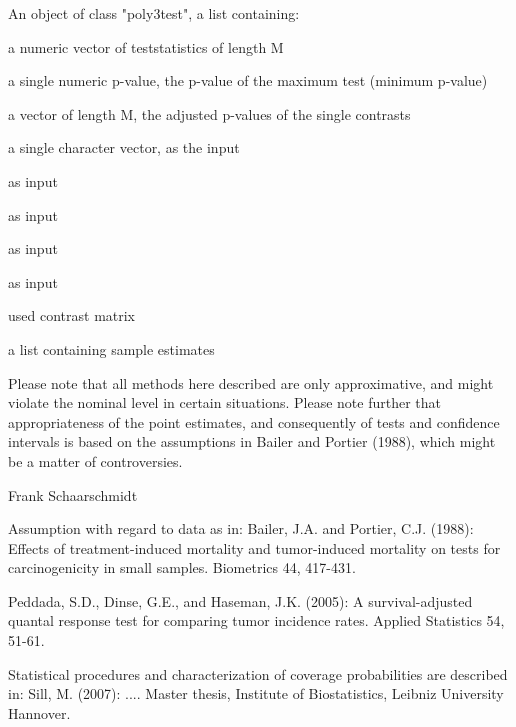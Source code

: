 \begin{Value}
An object of class "poly3test", a list containing:

\begin{ldescription}
\item[\code{teststat}] a numeric vector of teststatistics of length M
\item[\code{pval}] a single numeric p-value, the p-value of the maximum test (minimum p-value)
\item[\code{p.val.adj}] a vector of length M, the adjusted p-values of the single contrasts
\item[\code{alternative}] a single character vector, as the input
\item[\code{time}] as input
\item[\code{status}] as input
\item[\code{f}] as input
\item[\code{method}] as input
\item[\code{cmat}] used contrast matrix
\item[\code{sample.est}] a list containing sample estimates
\end{ldescription}
\end{Value}
\begin{Note}\relax
Please note that all methods here described are only approximative, and might violate the nominal level in certain situations.
Please note further that appropriateness of the point estimates, and consequently of tests and confidence intervals is based on the assumptions in Bailer and Portier (1988),
which might be a matter of controversies.
\end{Note}
\begin{Author}\relax
Frank Schaarschmidt
\end{Author}
\begin{References}\relax
Assumption with regard to data as in:
Bailer, J.A. and Portier, C.J. (1988):
Effects of treatment-induced mortality and tumor-induced mortality on tests for carcinogenicity in small samples.
Biometrics 44, 417-431.

Peddada, S.D., Dinse, G.E., and Haseman, J.K. (2005):
A survival-adjusted quantal response test for comparing tumor incidence rates.
Applied Statistics 54, 51-61.

Statistical procedures and characterization of coverage probabilities are described in:
Sill, M. (2007):
....
Master thesis, Institute of Biostatistics, Leibniz University Hannover.
\end{References}
